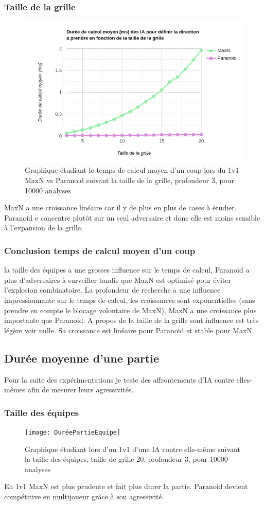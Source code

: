 \documentclass[a4paper,12pt]{article}
\begin{document}
\subsubsection{Taille de la grille}
\begin{figure}[h!]
		\centering	\includegraphics[width=0.5\linewidth]{TempsCoupTaille}
		\caption{Graphique étudiant le temps de calcul moyen d'un coup lors du 1v1 MaxN vs Paranoid suivant la taille de la grille, profondeur 3, pour 10000 analyses}
		\end{figure}
MaxN a une croissance linéaire car il y de plus en plus de cases à étudier. Paranoid e concentre plutôt sur un seul adversaire et donc elle est moins sensible à l'expansion de la grille.

\subsubsection{Conclusion temps de calcul moyen d'un coup}
la taille des équipes a une grosses influence sur le temps de calcul, Paranoid a plus d'adversaires à surveiller tandis que MaxN est optimisé pour éviter l'explosion combinatoire.
La profondeur de recherche a une influence impressionnante sur le temps de calcul, les croissances sont exponentielles (sans prendre en compte le blocage volontaire de MaxN), MaxN a une croissance plus importante que Paranoid.
A propos de la taille de la grille sont influence est très légère voir nulle. Sa croissance est linéaire pour Paranoid et stable pour MaxN.

\subsection{Durée moyenne d'une partie}
Pour la suite des expérimentations je teste des affrontements d'IA contre elles-mêmes afin de mesurer leurs agressivités.
\subsubsection{Taille des équipes}
\begin{figure}[h!]
		\centering	\texttt{[image: DuréePartieEquipe]}
		\caption{Graphique étudiant lors d'un 1v1 d'une IA contre elle-même suivant la taille des équipes, taille de grille 20, profondeur 3, pour 10000 analyses}
		\end{figure}
En 1v1 MaxN est plus prudente et fait plus durer la partie. Paranoid devient compétitive en multijoueur grâce à son agressivité.
\end{document}
